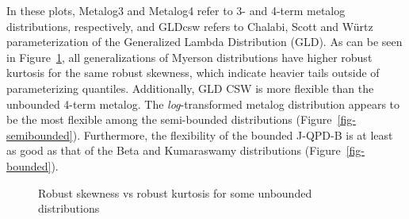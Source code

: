 \documentclass[
  fleqn,
  deca,
  blindrev
]{informs4}
\begin{document}
In these plots, Metalog3 and Metalog4 refer to 3- and 4-term metalog
distributions, respectively, and GLDcsw refers to
\textcolor[HTML]{ff0000}{Chalabi, Scott and Würtz}
\citep{chalabi2012FlexibleDistributionModeling} parameterization of the
Generalized Lambda Distribution (GLD). As can be seen in
Figure~\ref{fig-unbounded}, all generalizations of Myerson distributions
have higher robust kurtosis for the same robust
skewness\textcolor[HTML]{ff0000}{, which indicate heavier tails outside
of parameterizing quantiles.} Additionally, GLD CSW is more flexible
than the unbounded 4-term metalog. The \emph{log}-transformed metalog
distribution appears to be the \textcolor[HTML]{ff0000}{most flexible}
among the semi-bounded distributions (Figure~\ref{fig-semibounded}).
Furthermore, the flexibility of the bounded J-QPD-B is at least as good
as that of the Beta and Kumaraswamy distributions
(Figure~\ref{fig-bounded}).

\begin{figure}


\caption{\label{fig-unbounded}Robust skewness vs robust kurtosis for
some unbounded distributions}

\end{figure}%
\end{document}
